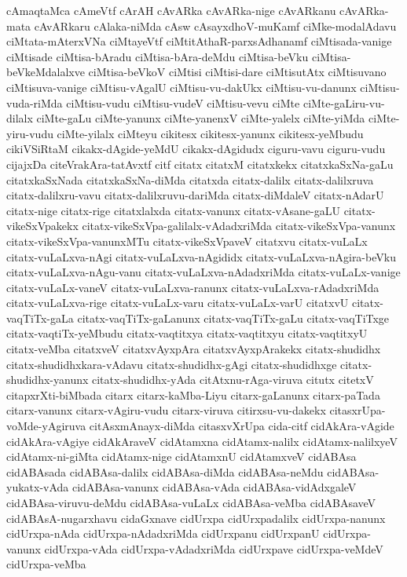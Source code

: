 {cAmaqtaMca
cAmeVtf
cArAH
cAvARka
cAvARka-nige
cAvARkanu
cAvARka-mata
cAvARkaru
cAlaka-niMda
cAsw
cAsayxdhoV-muKamf
ciMke-modalAdavu
ciMtata-mAterxVNa
ciMtayeVtf
ciMtitAthaR-parxsAdhanamf
ciMtisada-vanige
ciMtisade
ciMtisa-bAradu
ciMtisa-bAra-deMdu
ciMtisa-beVku
ciMtisa-beVkeMdalalxve
ciMtisa-beVkoV
ciMtisi
ciMtisi-dare
ciMtisutAtx
ciMtisuvano
ciMtisuva-vanige
ciMtisu-vAgalU
ciMtisu-vu-dakUkx
ciMtisu-vu-danunx
ciMtisu-vuda-riMda
ciMtisu-vudu
ciMtisu-vudeV
ciMtisu-vevu
ciMte
ciMte-gaLiru-vu-dilalx
ciMte-gaLu
ciMte-yanunx
ciMte-yanenxV
ciMte-yalelx
ciMte-yiMda
ciMte-yiru-vudu
ciMte-yilalx
ciMteyu
cikitesx
cikitesx-yanunx
cikitesx-yeMbudu
cikiVSiRtaM
cikakx-dAgide-yeMdU
cikakx-dAgidudx
ciguru-vavu
ciguru-vudu
cijajxDa
citeVrakAra-tatAvxtf
citf
citatx
citatxM
citatxkekx
citatxkaSxNa-gaLu
citatxkaSxNada
citatxkaSxNa-diMda
citatxda
citatx-dalilx
citatx-dalilxruva
citatx-dalilxru-vavu
citatx-dalilxruvu-dariMda
citatx-diMdaleV
citatx-nAdarU
citatx-nige
citatx-rige
citatxlalxda
citatx-vanunx
citatx-vAsane-gaLU
citatx-vikeSxVpakekx
citatx-vikeSxVpa-galilalx-vAdadxriMda
citatx-vikeSxVpa-vanunx
citatx-vikeSxVpa-vanunxMTu
citatx-vikeSxVpaveV
citatxvu
citatx-vuLaLx
citatx-vuLaLxva-nAgi
citatx-vuLaLxva-nAgididx
citatx-vuLaLxva-nAgira-beVku
citatx-vuLaLxva-nAgu-vanu
citatx-vuLaLxva-nAdadxriMda
citatx-vuLaLx-vanige
citatx-vuLaLx-vaneV
citatx-vuLaLxva-ranunx
citatx-vuLaLxva-rAdadxriMda
citatx-vuLaLxva-rige
citatx-vuLaLx-varu
citatx-vuLaLx-varU
citatxvU
citatx-vaqTiTx-gaLa
citatx-vaqTiTx-gaLanunx
citatx-vaqTiTx-gaLu
citatx-vaqTiTxge
citatx-vaqtiTx-yeMbudu
citatx-vaqtitxya
citatx-vaqtitxyu
citatx-vaqtitxyU
citatx-veMba
citatxveV
citatxvAyxpAra
citatxvAyxpArakekx
citatx-shudidhx
citatx-shudidhxkara-vAdavu
citatx-shudidhx-gAgi
citatx-shudidhxge
citatx-shudidhx-yanunx
citatx-shudidhx-yAda
citAtxnu-rAga-viruva
citutx
citetxV
citapxrXti-biMbada
citarx
citarx-kaMba-Liyu
citarx-gaLanunx
citarx-paTada
citarx-vanunx
citarx-vAgiru-vudu
citarx-viruva
citirxsu-vu-dakekx
citasxrUpa-voMde-yAgiruva
citAsxmAnayx-diMda
citasxvXrUpa
cida-citf
cidAkAra-vAgide
cidAkAra-vAgiye
cidAkAraveV
cidAtamxna
cidAtamx-nalilx
cidAtamx-nalilxyeV
cidAtamx-ni-giMta
cidAtamx-nige
cidAtamxnU
cidAtamxveV
cidABAsa
cidABAsada
cidABAsa-dalilx
cidABAsa-diMda
cidABAsa-neMdu
cidABAsa-yukatx-vAda
cidABAsa-vanunx
cidABAsa-vAda
cidABAsa-vidAdxgaleV
cidABAsa-viruvu-deMdu
cidABAsa-vuLaLx
cidABAsa-veMba
cidABAsaveV
cidABAsA-nugarxhavu
cidaGxnave
cidUrxpa
cidUrxpadalilx
cidUrxpa-nanunx
cidUrxpa-nAda
cidUrxpa-nAdadxriMda
cidUrxpanu
cidUrxpanU
cidUrxpa-vanunx
cidUrxpa-vAda
cidUrxpa-vAdadxriMda
cidUrxpave
cidUrxpa-veMdeV
cidUrxpa-veMba
}
